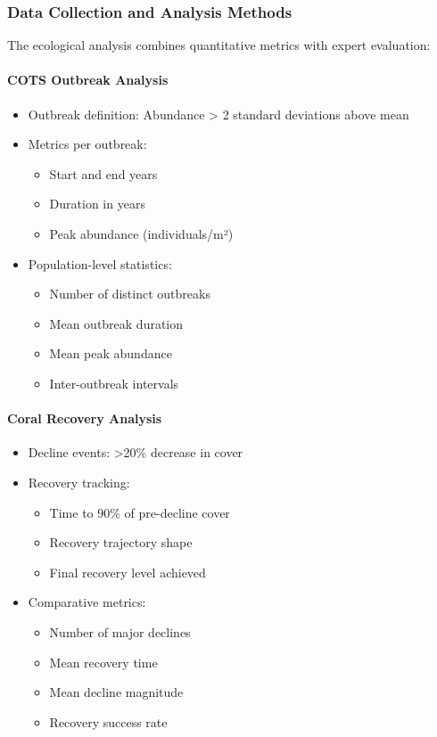 \subsubsection{Data Collection and Analysis Methods}

The ecological analysis combines quantitative metrics with expert evaluation:

\paragraph{COTS Outbreak Analysis}
\begin{itemize}
\item Outbreak definition: Abundance > 2 standard deviations above mean
\item Metrics per outbreak:
  \begin{itemize}
  \item Start and end years
  \item Duration in years
  \item Peak abundance (individuals/m²)
  \end{itemize}
\item Population-level statistics:
  \begin{itemize}
  \item Number of distinct outbreaks
  \item Mean outbreak duration
  \item Mean peak abundance
  \item Inter-outbreak intervals
  \end{itemize}
\end{itemize}

\paragraph{Coral Recovery Analysis}
\begin{itemize}
\item Decline events: >20\% decrease in cover
\item Recovery tracking:
  \begin{itemize}
  \item Time to 90\% of pre-decline cover
  \item Recovery trajectory shape
  \item Final recovery level achieved
  \end{itemize}
\item Comparative metrics:
  \begin{itemize}
  \item Number of major declines
  \item Mean recovery time
  \item Mean decline magnitude
  \item Recovery success rate
  \end{itemize}
\end{itemize}

